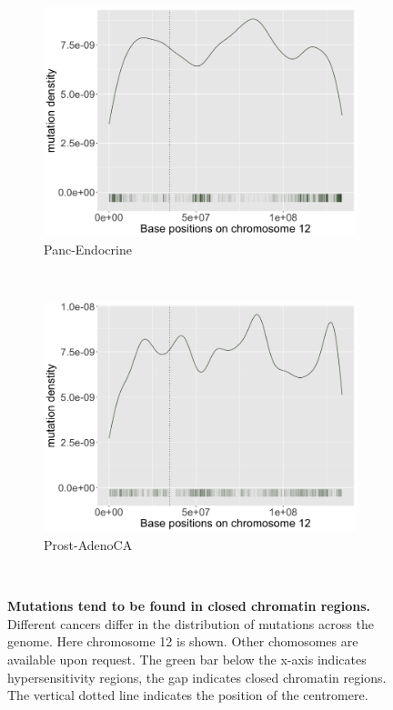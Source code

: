 \begin{figure}[h!]
    \begin{subfigure}{.5\textwidth}
    \includegraphics[width=\linewidth,height=0.7\textwidth]{graphics/mutdistribution_Panc-Endocrine.png}
    \caption{Panc-Endocrine}
    \end{subfigure} 
    ~
    \begin{subfigure}{.5\textwidth}
    \includegraphics[width=\linewidth,height=0.7\textwidth]{graphics/mutdistribution_Prost-AdenoCA.png}
    \caption{Prost-AdenoCA}
    \end{subfigure} \\

    \caption{\textbf{Mutations tend to be found in closed chromatin regions.} Different cancers differ in the distribution of mutations across the genome. Here chromosome 12 is shown. Other chomosomes are available upon request. The green bar below the x-axis indicates hypersensitivity regions, the gap indicates closed chromatin regions. The vertical dotted line indicates the position of the centromere.}
    \label{fig:apdx_mutation_density}
\end{figure}